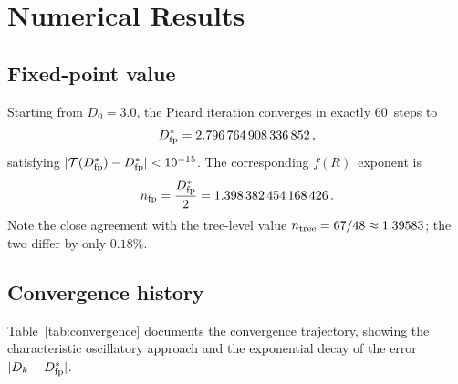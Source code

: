 \documentclass[amsmath,amssymb,aps,prd,twocolumn,superscriptaddress,nofootinbib]{revtex4-2}
\begin{document}
\section{Numerical Results}
\label{sec:numerical}

\subsection{Fixed-point value}

Starting from $D_0 = 3.0$, the Picard iteration converges in
exactly 60~steps to
\begin{equation}
  D^{*}_{\mathrm{fp}} = 2.796\,764\,908\,336\,852\,,
  \label{eq:Dstar_value}
\end{equation}
satisfying $\lvert\mathcal{T}(D^{*}_{\mathrm{fp}}) - D^{*}_{\mathrm{fp}}\rvert < 10^{-15}$.
The corresponding $f(R)$~exponent is
\begin{equation}
  n_{\mathrm{fp}} = \frac{D^{*}_{\mathrm{fp}}}{2} = 1.398\,382\,454\,168\,426\,.
  \label{eq:n_fp}
\end{equation}
Note the close agreement with the tree-level value
$n_{\mathrm{tree}} = 67/48 \approx 1.39583$; the two differ
by only $0.18\%$.

\subsection{Convergence history}

Table~\ref{tab:convergence} documents the convergence trajectory,
showing the characteristic oscillatory approach and the exponential
decay of the error $\lvert D_k - D^{*}_{\mathrm{fp}}\rvert$.
\end{document}
